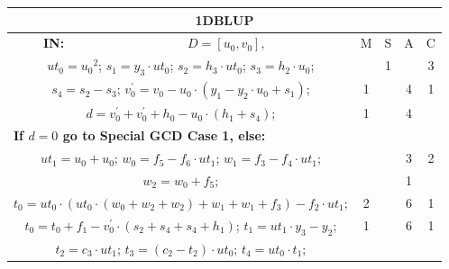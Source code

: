 \begin{tabular}{|c|cr|c|c|c|c|}
\hline
\multicolumn{7}{|c|}{\bf{1DBLUP}} \TS \\
\hline
\bf{IN:} &\multicolumn{2}{|c|}{$D = [u_0,v_0], $}
\TS & M & \hspace{1pt}S\hspace{1pt} & A & \hspace{1pt}C\hspace{1pt} \\
\hline
\multicolumn{3}{|R{340pt}|}{ 
$ut_0=u_0{}^{2}$;\hspace{4pt}
$s_1=y_3 \cdot ut_0$;\hspace{4pt}
$s_2=h_3 \cdot ut_0$;\hspace{4pt}
$s_3=h_2 \cdot u_0$;\hspace{4pt}
} &  & 1 &  & 3\\
\multicolumn{3}{|R{340pt}|}{ 
$s_4=s_2-s_3$;\hspace{4pt}
$v^{\prime}_0=v_0-u_0 \cdot (y_1-y_2 \cdot u_0+s_1)$;\hspace{4pt}
} & 1 &  & 4 & 1\\
\multicolumn{3}{|R{340pt}|}{ 
$d=v^{\prime}_0+v^{\prime}_0+h_0-u_0 \cdot (h_1+s_4)$;\hspace{4pt}
} & 1 &  & 4 & \\
\multicolumn{3}{|l|}{ 
 \bf{If $d = 0$ go to Special GCD Case 1, else:} } &  &  &  & \\
\multicolumn{3}{|R{340pt}|}{ 
$ut_1=u_0+u_0$;\hspace{4pt}
$w_0=f_5-f_6 \cdot ut_1$;\hspace{4pt}
$w_1=f_3-f_4 \cdot ut_1$;\hspace{4pt}
} &  &  & 3 & 2\\
\multicolumn{3}{|R{340pt}|}{ 
$w_2=w_0+f_5$;\hspace{4pt}
} &  &  & 1 & \\
\multicolumn{3}{|R{340pt}|}{ 
$t_0=ut_0 \cdot (ut_0 \cdot (w_0+w_2+w_2)+w_1+w_1+f_3)-f_2 \cdot ut_1$;\hspace{4pt}
} & 2 &  & 6 & 1\\
\multicolumn{3}{|R{340pt}|}{ 
$t_0=t_0+f_1-v^{\prime}_0 \cdot (s_2+s_4+s_4+h_1)$;\hspace{4pt}
$t_1=ut_1 \cdot y_3-y_2$;\hspace{4pt}
} & 1 &  & 6 & 1\\
\multicolumn{3}{|R{340pt}|}{ 
$t_2=c_3 \cdot ut_1$;\hspace{4pt}
$t_3=(c_2-t_2) \cdot ut_0$;\hspace{4pt}
$t_4=ut_0 \cdot t_1$;\hspace{4pt}
}
\end{tabular}

